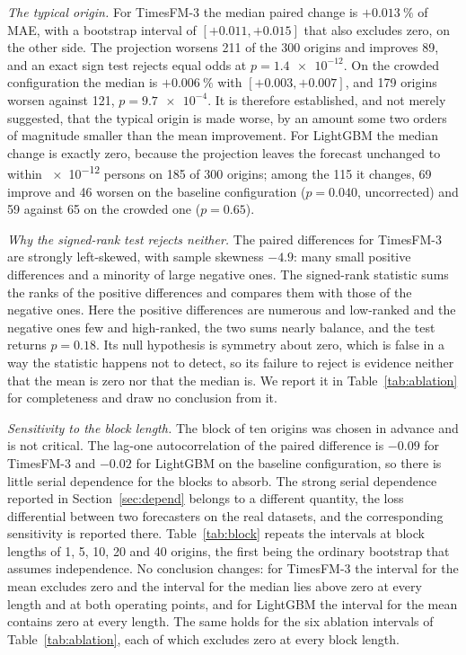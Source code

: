 \documentclass[utf8]{FrontiersinHarvard}
\newif\ifsecondrevisionmarkup
\newcommand{\rev}[1]{\ifsecondrevisionmarkup\textcolor{revisiontwo}{#1}\else#1\fi}
\theoremstyle{plain}
\theoremstyle{definition}
\theoremstyle{remark}
\begin{document}
\rev{\emph{The typical origin.} For TimesFM-3 the median paired change is $+\SI{0.013}{\percent}$ of MAE, with a bootstrap interval of $[+0.011,+0.015]$ that also excludes zero, on the other side. The projection worsens \num{211} of the \num{300} origins and improves \num{89}, and an exact sign test rejects equal odds at $p=\num{1.4e-12}$. On the crowded configuration the median is $+\SI{0.006}{\percent}$ with $[+0.003,+0.007]$, and \num{179} origins worsen against \num{121}, $p=\num{9.7e-4}$. It is therefore established, and not merely suggested, that the typical origin is made worse, by an amount some two orders of magnitude smaller than the mean improvement. For LightGBM the median change is exactly zero, because the projection leaves the forecast unchanged to within \num{e-12} persons on \num{185} of \num{300} origins; among the \num{115} it changes, \num{69} improve and \num{46} worsen on the baseline configuration ($p=\num{0.040}$, uncorrected) and \num{59} against \num{65} on the crowded one ($p=\num{0.65}$).}

\rev{\emph{Why the signed-rank test rejects neither.} The paired differences for TimesFM-3 are strongly left-skewed, with sample skewness $-4.9$: many small positive differences and a minority of large negative ones. The signed-rank statistic sums the ranks of the positive differences and compares them with those of the negative ones. Here the positive differences are numerous and low-ranked and the negative ones few and high-ranked, the two sums nearly balance, and the test returns $p=\num{0.18}$. Its null hypothesis is symmetry about zero, which is false in a way the statistic happens not to detect, so its failure to reject is evidence neither that the mean is zero nor that the median is. We report it in Table~\ref{tab:ablation} for completeness and draw no conclusion from it.}

\rev{\emph{Sensitivity to the block length.} The block of ten origins was chosen in advance and is not critical. The lag-one autocorrelation of the paired difference is $-0.09$ for TimesFM-3 and $-0.02$ for LightGBM on the baseline configuration, so there is little serial dependence for the blocks to absorb. The strong serial dependence reported in Section~\ref{sec:depend} belongs to a different quantity, the loss differential between two forecasters on the real datasets, and the corresponding sensitivity is reported there. Table~\ref{tab:block} repeats the intervals at block lengths of \num{1}, \num{5}, \num{10}, \num{20} and \num{40} origins, the first being the ordinary bootstrap that assumes independence. No conclusion changes: for TimesFM-3 the interval for the mean excludes zero and the interval for the median lies above zero at every length and at both operating points, and for LightGBM the interval for the mean contains zero at every length. The same holds for the six ablation intervals of Table~\ref{tab:ablation}, each of which excludes zero at every block length.}
\end{document}
